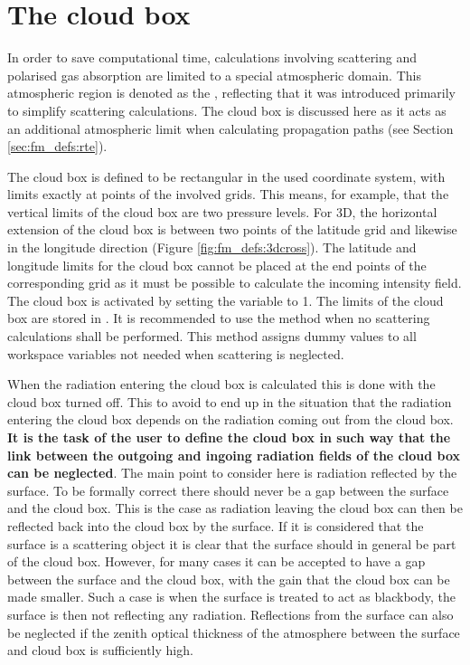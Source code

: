 \section{The cloud box}
\label{sec:fm_defs:cloudbox}
In order to save computational time, calculations involving scattering and
polarised gas absorption are limited to a special atmospheric domain. This
atmospheric region is denoted as the , reflecting that it
was introduced primarily to simplify scattering calculations. The cloud box is
discussed here as it acts as an additional atmospheric limit when calculating
propagation paths (see Section \ref{sec:fm_defs:rte}).

The cloud box is defined to be rectangular in the used coordinate
system, with limits exactly at points of the involved grids. This
means, for example, that the vertical limits of the cloud box are two
pressure levels. For 3D, the horizontal extension of the cloud box
is between two points of the latitude grid and likewise in the
longitude direction (Figure \ref{fig:fm_defs:3dcross}). The latitude
and longitude limits for the cloud box cannot be placed at the end
points of the corresponding grid as it must be possible to calculate
the incoming intensity field. The cloud box is activated by setting
the variable  to 1.  The limits of the cloud
box are stored in .  It is recommended to
use the method  when no scattering calculations
shall be performed. This method assigns dummy values to all workspace
variables not needed when scattering is neglected.

When the radiation entering the cloud box is calculated this is done
with the cloud box turned off. This to avoid to end up in the
situation that the radiation entering the cloud box depends on the
radiation coming out from the cloud box. {\bf It is the task of the
  user to define the cloud box in such way that the link between the
  outgoing and ingoing radiation fields of the cloud box can be
  neglected}. The main point to consider here is radiation reflected
by the surface. To be formally correct there should never be a gap
between the surface and the cloud box. This is the case as radiation
leaving the cloud box can then be reflected back into the cloud box by
the surface. If it is considered that the surface is a scattering object
it is clear that the surface should in general be part of the cloud
box. However, for many cases it can be accepted to have a gap between
the surface and the cloud box, with the gain that the cloud box can be
made smaller. Such a case is when the surface is treated to act as
blackbody, the surface is then not reflecting any radiation.
Reflections from the surface can also be neglected if the zenith
optical thickness of the atmosphere between the surface and cloud box
is sufficiently high.


